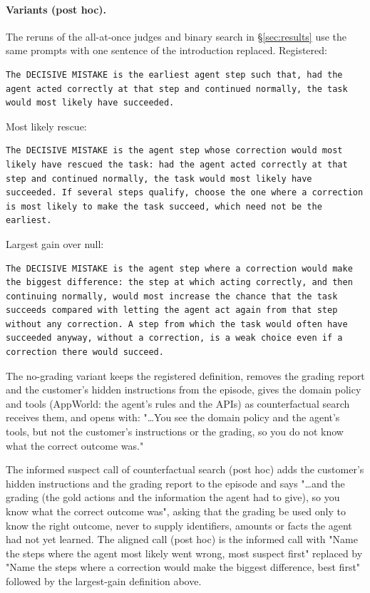 \documentclass[11pt]{article}
\begin{document}
\paragraph{Variants (post hoc).} The reruns of the all-at-once judges and binary search in \S\ref{sec:results} use the same prompts with one sentence of the introduction replaced. Registered:
\begin{Verbatim}[fontsize=\scriptsize, breaklines, breakanywhere]
The DECISIVE MISTAKE is the earliest agent step such that, had the agent acted correctly at that step and continued normally, the task would most likely have succeeded.
\end{Verbatim}
Most likely rescue:
\begin{Verbatim}[fontsize=\scriptsize, breaklines, breakanywhere]
The DECISIVE MISTAKE is the agent step whose correction would most likely have rescued the task: had the agent acted correctly at that step and continued normally, the task would most likely have succeeded. If several steps qualify, choose the one where a correction is most likely to make the task succeed, which need not be the earliest.
\end{Verbatim}
Largest gain over null:
\begin{Verbatim}[fontsize=\scriptsize, breaklines, breakanywhere]
The DECISIVE MISTAKE is the agent step where a correction would make the biggest difference: the step at which acting correctly, and then continuing normally, would most increase the chance that the task succeeds compared with letting the agent act again from that step without any correction. A step from which the task would often have succeeded anyway, without a correction, is a weak choice even if a correction there would succeed.
\end{Verbatim}
The no-grading variant keeps the registered definition, removes the grading report and the customer's hidden instructions from the episode, gives the domain policy and tools (AppWorld: the agent's rules and the APIs) as counterfactual search receives them, and opens with: "\dots You see the domain policy and the agent's tools, but not the customer's instructions or the grading, so you do not know what the correct outcome was."

The informed suspect call of counterfactual search (post hoc) adds the customer's hidden instructions and the grading report to the episode and says "\dots and the grading (the gold actions and the information the agent had to give), so you know what the correct outcome was", asking that the grading be used only to know the right outcome, never to supply identifiers, amounts or facts the agent had not yet learned. The aligned call (post hoc) is the informed call with "Name the steps where the agent most likely went wrong, most suspect first" replaced by "Name the steps where a correction would make the biggest difference, best first" followed by the largest-gain definition above.
\end{document}
